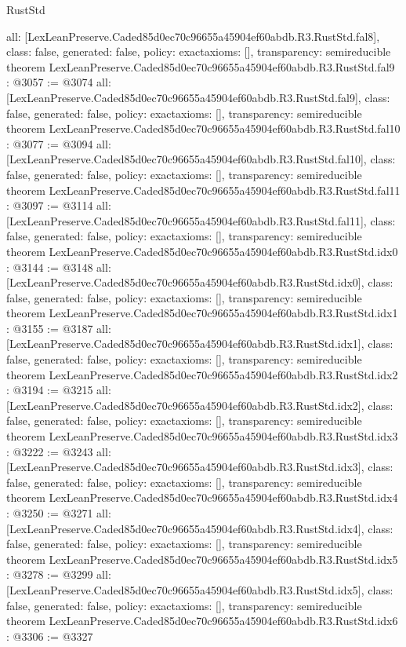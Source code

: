 \begin{lexlean}{RustStd}
\begin{coremodule}
{  all: [LexLeanPreserve.Caded85d0ec70c96655a45904ef60abdb.R3.RustStd.fal8],
  class: false,
  generated: false,
  policy: exact{axioms: []},
  transparency: semireducible
}
theorem LexLeanPreserve.Caded85d0ec70c96655a45904ef60abdb.R3.RustStd.fal9 : @3057 := @3074 {
  all: [LexLeanPreserve.Caded85d0ec70c96655a45904ef60abdb.R3.RustStd.fal9],
  class: false,
  generated: false,
  policy: exact{axioms: []},
  transparency: semireducible
}
theorem LexLeanPreserve.Caded85d0ec70c96655a45904ef60abdb.R3.RustStd.fal10 : @3077 := @3094 {
  all: [LexLeanPreserve.Caded85d0ec70c96655a45904ef60abdb.R3.RustStd.fal10],
  class: false,
  generated: false,
  policy: exact{axioms: []},
  transparency: semireducible
}
theorem LexLeanPreserve.Caded85d0ec70c96655a45904ef60abdb.R3.RustStd.fal11 : @3097 := @3114 {
  all: [LexLeanPreserve.Caded85d0ec70c96655a45904ef60abdb.R3.RustStd.fal11],
  class: false,
  generated: false,
  policy: exact{axioms: []},
  transparency: semireducible
}
theorem LexLeanPreserve.Caded85d0ec70c96655a45904ef60abdb.R3.RustStd.idx0 : @3144 := @3148 {
  all: [LexLeanPreserve.Caded85d0ec70c96655a45904ef60abdb.R3.RustStd.idx0],
  class: false,
  generated: false,
  policy: exact{axioms: []},
  transparency: semireducible
}
theorem LexLeanPreserve.Caded85d0ec70c96655a45904ef60abdb.R3.RustStd.idx1 : @3155 := @3187 {
  all: [LexLeanPreserve.Caded85d0ec70c96655a45904ef60abdb.R3.RustStd.idx1],
  class: false,
  generated: false,
  policy: exact{axioms: []},
  transparency: semireducible
}
theorem LexLeanPreserve.Caded85d0ec70c96655a45904ef60abdb.R3.RustStd.idx2 : @3194 := @3215 {
  all: [LexLeanPreserve.Caded85d0ec70c96655a45904ef60abdb.R3.RustStd.idx2],
  class: false,
  generated: false,
  policy: exact{axioms: []},
  transparency: semireducible
}
theorem LexLeanPreserve.Caded85d0ec70c96655a45904ef60abdb.R3.RustStd.idx3 : @3222 := @3243 {
  all: [LexLeanPreserve.Caded85d0ec70c96655a45904ef60abdb.R3.RustStd.idx3],
  class: false,
  generated: false,
  policy: exact{axioms: []},
  transparency: semireducible
}
theorem LexLeanPreserve.Caded85d0ec70c96655a45904ef60abdb.R3.RustStd.idx4 : @3250 := @3271 {
  all: [LexLeanPreserve.Caded85d0ec70c96655a45904ef60abdb.R3.RustStd.idx4],
  class: false,
  generated: false,
  policy: exact{axioms: []},
  transparency: semireducible
}
theorem LexLeanPreserve.Caded85d0ec70c96655a45904ef60abdb.R3.RustStd.idx5 : @3278 := @3299 {
  all: [LexLeanPreserve.Caded85d0ec70c96655a45904ef60abdb.R3.RustStd.idx5],
  class: false,
  generated: false,
  policy: exact{axioms: []},
  transparency: semireducible
}
theorem LexLeanPreserve.Caded85d0ec70c96655a45904ef60abdb.R3.RustStd.idx6 : @3306 := @3327 {
}
\end{coremodule}
\end{lexlean}
